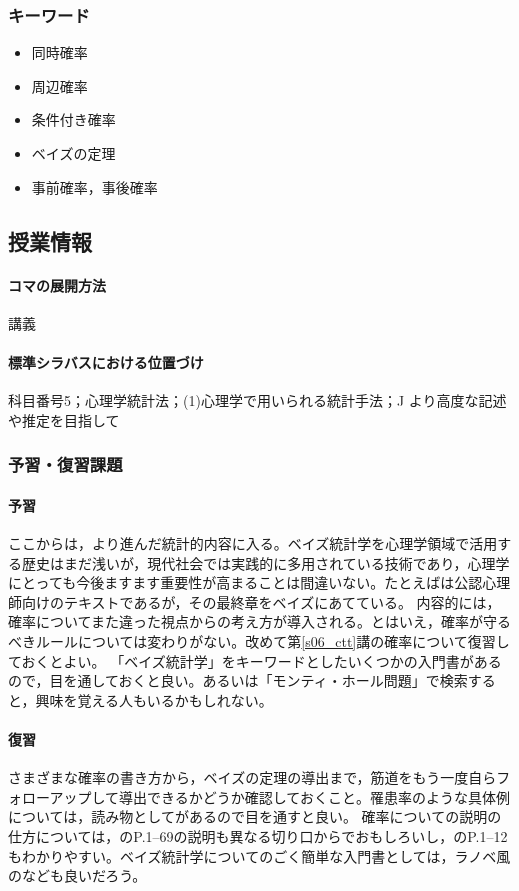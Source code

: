 \subsubsection{キーワード}
\begin{itemize}
	\item 同時確率
	\item 周辺確率
	\item 条件付き確率
	\item ベイズの定理
	\item 事前確率，事後確率
\end{itemize}
\subsection{授業情報}
\paragraph{コマの展開方法}
講義
\paragraph{標準シラバスにおける位置づけ}
科目番号5；心理学統計法；(1)心理学で用いられる統計手法；J より高度な記述や推定を目指して
\subsubsection{予習・復習課題}
\paragraph{予習}
ここからは，より進んだ統計的内容に入る。ベイズ統計学を心理学領域で活用する歴史はまだ浅いが，現代社会では実践的に多用されている技術であり，心理学にとっても今後ますます重要性が高まることは間違いない。たとえば\citet{Nojima201903}は公認心理師向けのテキストであるが，その最終章をベイズにあてている。
内容的には，確率についてまた違った視点からの考え方が導入される。とはいえ，確率が守るべきルールについては変わりがない。改めて第\ref{s06_ctt}講の確率について復習しておくとよい。
「ベイズ統計学」をキーワードとしたいくつかの入門書があるので，目を通しておくと良い。あるいは「モンティ・ホール問題」で検索すると，興味を覚える人もいるかもしれない。
\paragraph{復習}
さまざまな確率の書き方から，ベイズの定理の導出まで，筋道をもう一度自らフォローアップして導出できるかどうか確認しておくこと。罹患率のような具体例については，読み物として\citet{Gerd200309}があるので目を通すと良い。
確率についての説明の仕方については，\citet{Hiraoka200910}のP.1--69の説明も異なる切り口からでおもしろいし，\citet{Ishida201801}のP.1--12もわかりやすい。ベイズ統計学についてのごく簡単な入門書としては，ラノベ風の\citet{Ishida201902}なども良いだろう。